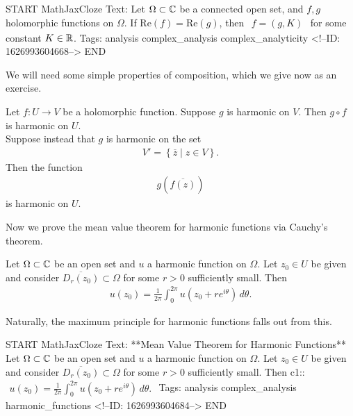 \documentclass{memoir}
\begin{document}
\begin{anki}
START
MathJaxCloze
Text: Let \(\Omega \subset \mathbb{C}\) be a connected open set, and \(f,g\) holomorphic functions on \(\Omega \). If \(\textrm{Re}(f) = \textrm{Re}(g)\), then
\(\begin{align*}
  	f = (g, K)
  \end{align*}\)
for some constant \(K \in \mathbb{R}\).
Tags: analysis complex_analysis complex_analyticity
<!--ID: 1626993604668-->
END
\end{anki}

We will need some simple properties of composition, which we give now as an exercise.
\begin{hw}
	Let \(f:U\to V\) be a holomorphic function. Suppose \(g\) is harmonic on \(V\). Then \(g\circ f \) is harmonic on \(U\).\\

	Suppose instead that \(g\) is harmonic on the set
	\begin{align*}
		V' = \left\{ \overline{z} \mid z \in V \right\} .
	\end{align*}
	Then the function
	\begin{align*}
		g(\overline{f(z)})
	\end{align*}
	is harmonic on \(U\).
\end{hw}

Now we prove the mean value theorem for harmonic functions via Cauchy's theorem.
\begin{thm}
	Let \(\Omega \subset \mathbb{C}\) be an open set and \(u\) a harmonic function on \(\Omega \). Let \(z_0 \in U\) be given and consider \(\overline{D_r(z_0)}\subset \Omega \) for some \(r>0\) sufficiently small. Then
	\begin{align*}
		u(z_0) = \frac{1}{2\pi } \int_{0}^{2\pi } u(z_0+re^{i\theta }) \,d \theta . 
	\end{align*}
\end{thm}
Naturally, the maximum principle for harmonic functions falls out from this.

\begin{anki}
START
MathJaxCloze
Text: **Mean Value Theorem for Harmonic Functions**
Let \(\Omega \subset \mathbb{C}\) be an open set and \(u\) a harmonic function on \(\Omega \). Let \(z_0 \in U\) be given and consider \(\overline{D_r(z_0)}\subset \Omega \) for some \(r>0\) sufficiently small. Then
 {{c1::\(\begin{align*}
         	u(z_0) = \frac{1}{2\pi } \int_{0}^{2\pi } u(z_0+re^{i\theta }) \,d \theta . 
         \end{align*}\)}} 
Tags: analysis complex_analysis harmonic_functions
<!--ID: 1626993604684-->
END
\end{anki}
\end{document}
